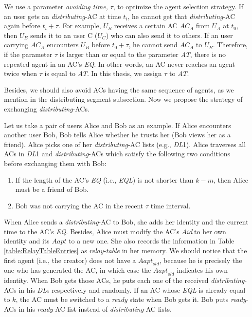 We use a parameter \textit{avoiding time,} $\tau$, to optimize the agent selection strategy. If an user gets an \textit{distributing}-AC at time $t_i$, he cannot get that \textit{distributing}-AC again before $t_i+\tau $. For example, $U_B$ receives a certain AC ${AC}_A$ from $U_A$ at $t_0$, then $U_B$ sends it to an user C ($U_C$) who can also send it to others. If an user carrying ${AC}_A$ encounters $U_B$  before $t_0+\tau $, he cannot send ${AC}_A$ to $U_B$. Therefore, if the parameter $\tau $ is larger than or equal to the parameter \textit{AT}, there is no repeated agent in an AC's \textit{EQ}. In other words, an AC never reaches an agent twice when $\tau $ is equal to \textit{AT}. In this thesis, we assign $\tau $ to \textit{AT}. 

Besides, we should also avoid ACs having the same sequence of agents, as we mention in the distributing segment subsection. Now we propose the strategy of exchanging \textit{distributing}-ACs.

Let us take a pair of users Alice and Bob as an example. If Alice encounters another user Bob, Bob tells Alice whether he trusts her (Bob views her as a friend). Alice picks one of her \textit{distributing}-AC lists (e.g., \textit{DL}1). Alice traverses all ACs in \textit{DL}1 and \textit{distributing}-ACs which satisfy the following two conditions before exchanging them with Bob:

\begin{enumerate}
\item  If the length of the AC's \textit{EQ} (i.e., \textit{EQL}) is not shorter than $k-m$, then Alice must be a friend of Bob.

\item  Bob was not carrying the AC in the recent $\tau $ time interval.
\end{enumerate}

When Alice sends a \textit{distributing}-AC to Bob, she adds her identity and the current time to the AC's \textit{EQ}. Besides, Alice must modify the AC's $Aid\mathrm{\ }$to her own identity and its $Aapt$ to a new one. She also records the information in Table \ref{table:RelayTableEntries} as \textit{relay-table} in her memory. We should notice that the first agent (i.e., the creator) does not have a ${Aapt}_{old}$, because he is precisely the one who has generated the AC, in which case the ${Aapt}_{old}$ indicates his own identity. When Bob gets those ACs, he puts each one of the received \textit{distributing}-ACs in his \textit{DL}s respectively and randomly. If an AC whose \textit{EQL} is already equal to $k$, the AC must be switched to a \textit{ready} state when Bob gets it. Bob puts \textit{ready}-ACs in his \textit{ready}-AC list instead of \textit{distributing}-AC lists.

